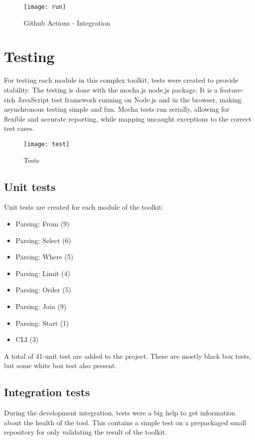\begin{figure}[H]
	\centering
	\texttt{[image: run]}
	\caption{Github Actions - Integration}
	\label{fig:fig-int}
\end{figure}


\section{Testing}

For testing each module in this complex toolkit, tests were created to provide stability. The testing is done with the mocha.js\cite{mocha} node.js package. It is a feature-rich JavaScript test framework running on Node.js and in the browser, making asynchronous testing simple and fun. Mocha tests run serially, allowing for flexible and accurate reporting, while mapping uncaught exceptions to the correct test cases.

\begin{figure}[H]
	\centering
	\texttt{[image: test]}
	\caption{Tests}
	\label{fig:fig-test}
\end{figure}

\subsection{Unit tests}

Unit tests are created for each module of the toolkit:

\begin{itemize}
	\item Parsing: From (9)
	\item Parsing: Select (6)
	\item Parsing: Where (5)
	\item Parsing: Limit (4)
	\item Parsing: Order (5)
	\item Parsing: Join (9)
	\item Parsing: Start (1)
	\item CLI (3)
\end{itemize}

A total of 41-unit test are added to the project. These are mostly black box tests, but some white box test also present.

\subsection{Integration tests}

During the development integration, tests were a big help to get information about the health of the tool. This contains a simple test on a prepackaged small repository for only validating the result of the toolkit.

